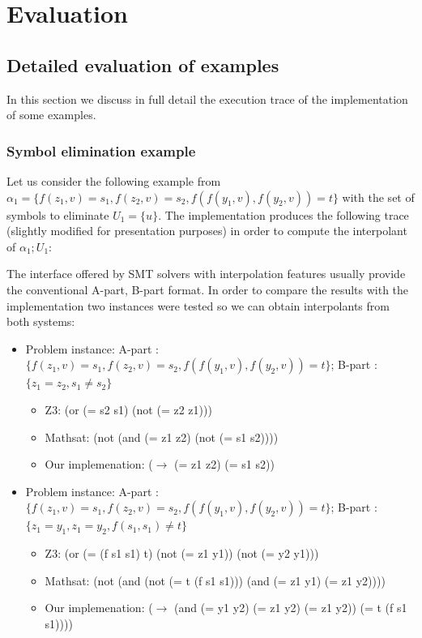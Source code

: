 \section{Evaluation}

\subsection{Detailed evaluation of examples}

In this section we discuss in full detail the execution trace
of the implementation of some examples. 

\subsubsection{Symbol elimination example}

Let us consider the following example from \cite{KAPUR2017} 
$\alpha_1 = \{f(z_1, v) = s_1, f(z_2, v) = s_2, f(f(y_1, v), f(y_2, v)) = t\}$
with the set of symbols to eliminate $U_1 = \{u\}$. The implementation produces the following
trace (slightly modified for presentation purposes) in order to compute 
the interpolant of $\alpha_1; U_1$:



The interface offered by SMT solvers with interpolation features usually provide the 
conventional A-part, B-part format. In order to compare the results with the implementation two 
instances were tested so we can obtain interpolants from both systems:

\begin{itemize}
\item Problem instance: A-part : $\{f(z_1, v) = s_1, f(z_2, v) 
  = s_2, f(f(y_1, v), f(y_2, v)) = t\}$; B-part : 
  $\{z_1 = z_2, s_1 \neq s_2 \}$
\begin{itemize}
\item Z3: (or (= s2 s1) (not (= z2 z1)))
\item Mathsat: (not (and (= z1 z2) (not (= s1 s2))))
\item Our implemenation: ($\rightarrow$ (= z1 z2) (= s1 s2))
\end{itemize}

\item Problem instance: A-part : $\{f(z_1, v) = s_1, f(z_2, v) 
  = s_2, f(f(y_1, v), f(y_2, v)) = t\}$; 
  B-part : $\{z_1 = y_1, z_1 = y_2, f(s_1, s_1) \neq t\}$
\begin{itemize}
\item Z3: (or (= (f s1 s1) t) (not (= z1 y1)) (not (= y2 y1)))
\item Mathsat: (not (and (not (= t (f s1 s1))) (and (= z1 y1) (= z1 y2))))
\item Our implemenation: ($\rightarrow$ (and (= y1 y2) (= z1 y2) (= z1 y2)) (= t (f s1 s1))))
\end{itemize}

\end{itemize}

